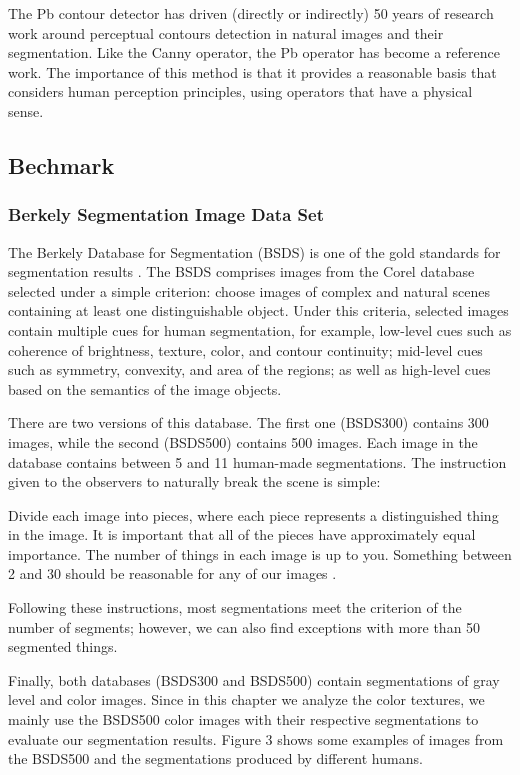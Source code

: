 \documentclass[journal]{IEEEtran}
\begin{document}
The Pb contour detector has driven (directly or indirectly) 50 years of research work around perceptual contours detection in natural images and their segmentation. Like the Canny operator, the Pb operator has become a reference work. The importance of this method is that it provides a reasonable basis that considers human perception principles, using operators that have a physical sense. 

\subsection{Bechmark}

\subsubsection{Berkely Segmentation Image Data Set}
The Berkely Database for Segmentation (BSDS) is one of the gold standards for segmentation results \cite{Martin.Fowlkes.ea:ICCV:2001}. The BSDS comprises images from the Corel database selected under a simple criterion: choose images of complex and natural scenes containing at least one distinguishable object. Under this criteria, selected images contain multiple cues for human segmentation, for example, low-level cues such as coherence of brightness, texture, color, and contour continuity; mid-level cues such as symmetry, convexity, and area of the regions; as well as high-level cues based on the semantics of the image objects.

There are two versions of this database. The first one (BSDS300) contains 300 images, while the second (BSDS500) contains 500 images. Each image in the database contains between 5 and 11 human-made segmentations. The instruction given to the observers to naturally break the scene is simple:
\begin{displayquote}
Divide each image into pieces, where each piece represents a distinguished thing in the image. It is important that all of the pieces have approximately equal importance. The number of things in each image is up to you. Something between 2 and 30 should be reasonable for any of our images \cite{Martin.Fowlkes.ea:ICCV:2001}.
\end{displayquote}
Following these instructions, most segmentations meet the criterion of the number of segments; however, we can also find exceptions with more than 50 segmented things.

Finally, both databases (BSDS300 and BSDS500) contain segmentations of gray level and color images. Since in this chapter we analyze the color textures, we mainly use the BSDS500 color images with their respective segmentations to evaluate our segmentation results. Figure 3 shows some examples of images from the BSDS500 and the segmentations produced by different humans.
\end{document}
